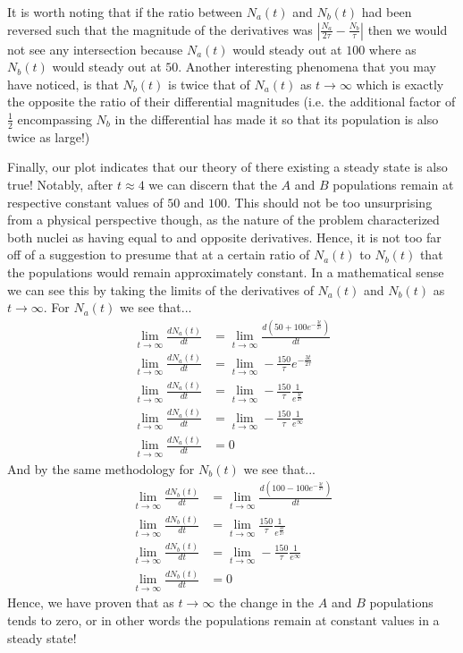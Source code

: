 \documentclass[twocolumn]{article}
\begin{document}
It is worth noting that if the ratio between $N_a(t)$ and $N_b(t)$ had been reversed such that the magnitude of the derivatives was $\left|\frac{N_a}{2\tau}-\frac{N_b}{\tau}\right|$ then we would not see any intersection because $N_a(t)$ would steady out at $100$ where as $N_b(t)$ would steady out at $50$. Another interesting phenomena that you may have noticed, is that $N_b(t)$ is twice that of $N_a(t)$ as $t\to\infty$ which is exactly the opposite the ratio of their differential magnitudes (i.e. the additional factor of $\frac{1}{2}$ encompassing $N_b$ in the differential has made it so that its population is also twice as large!)
  
Finally, our plot indicates that our theory of there existing a steady state is also true! Notably, after $t\approx4$ we can discern that the $A$ and $B$ populations remain at respective constant values of $50$ and $100$. This should not be too unsurprising from a physical perspective though, as the nature of the problem characterized both nuclei as having equal to and opposite derivatives. Hence, it is not too far off of a suggestion to presume that at a certain ratio of $N_a(t)$ to $N_b(t)$ that the populations would remain approximately constant. In a mathematical sense we can see this by taking the limits of the derivatives of $N_a(t)$ and $N_b(t)$ as $t\to\infty$. For $N_a(t)$ we see that...
	\begin{align}
	\lim_{t\to\infty}\frac{dN_a(t)}{dt}&=\lim_{t\to\infty}\frac{d\left(50+100e^{-\frac{3t}{2\tau}}\right)}{dt}\\
	\lim_{t\to\infty}\frac{dN_a(t)}{dt}&=\lim_{t\to\infty}-\frac{150}{\tau}e^{-\frac{3t}{2\tau}}\\
	\lim_{t\to\infty}\frac{dN_a(t)}{dt}&=\lim_{t\to\infty}-\frac{150}{\tau}\frac{1}{e^{\frac{3t}{2\tau}}}\\
	\lim_{t\to\infty}\frac{dN_a(t)}{dt}&=\lim_{t\to\infty}-\frac{150}{\tau}\frac{1}{e^{\infty}}\\
	\lim_{t\to\infty}\frac{dN_a(t)}{dt}&=0
	\end{align}
And by the same methodology for $N_b(t)$ we see that...
	\begin{align}
	\lim_{t\to\infty}\frac{dN_b(t)}{dt}&=\lim_{t\to\infty}\frac{d\left(100-100e^{-\frac{3t}{2\tau}}\right)}{dt}\\
	\lim_{t\to\infty}\frac{dN_b(t)}{dt}&=\lim_{t\to\infty}\frac{150}{\tau}\frac{1}{e^{\frac{3t}{2\tau}}}\\
	\lim_{t\to\infty}\frac{dN_b(t)}{dt}&=\lim_{t\to\infty}-\frac{150}{\tau}\frac{1}{e^{\infty}}\\
	\lim_{t\to\infty}\frac{dN_b(t)}{dt}&=0
	\end{align}
Hence, we have proven that as $t\to\infty$ the change in the $A$ and $B$ populations tends to zero, or in other words the populations remain at constant values in a steady state!
\end{document}

